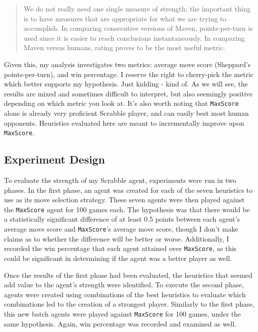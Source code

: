 \documentclass[letterpaper]{article}
\begin{document}
\begin{quote}
We do not really need one single measure of strength; the important thing is to have measures that are appropriate for what we are trying to accomplish. In comparing consecutive  versions  of  Maven, points-per-turn is used since it is easier to reach conclusions instantaneously. In comparing Maven versus humans, rating proves to be the most useful metric. \cite{1sheppard2002}
\end{quote}

Given this, my analysis investigates two metrics: average move score  (Sheppard's points-per-turn), and win percentage. I reserve the right to cherry-pick the metric which better supports my hypothesis. Just kidding - kind of. As we will see, the results are mixed and sometimes difficult to interpret, but also seemingly positive depending on which metric you look at. It's also worth noting that \texttt{MaxScore} alone is already very proficient Scrabble player, and can easily best most human opponents. Heuristics evaluated here are meant to incrementally improve upon \texttt{MaxScore}.

\subsection{Experiment Design}
To evaluate the strength of my Scrabble agent, experiments were run in two phases. In the first phase, an agent was created for each of the seven heuristics to use as its move selection strategy. These seven agents were then played against the \texttt{MaxScore} agent for 100 games each. The hypothesis was that there would be a statistically significant difference of at least 0.5 points between each agent's average move score and \texttt{MaxScore}'s average move score, though I don't make claims as to whether the difference will be better or worse. Additionally, I recorded the win percentage that each agent attained over \texttt{MaxScore}, as this could be significant in determining if the agent was a better player as well.

Once the results of the first phase had been evaluated, the heuristics that seemed add value to the agent's strength were identified. To execute the second phase, agents were created using combinations of the best heuristics to evaluate which combinations led to the creation of a strongest player. Similarly to the first phase, this new batch agents were played against \texttt{MaxScore} for 100 games, under the same hypothesis. Again, win percentage was recorded and examined as well.
\end{document}

